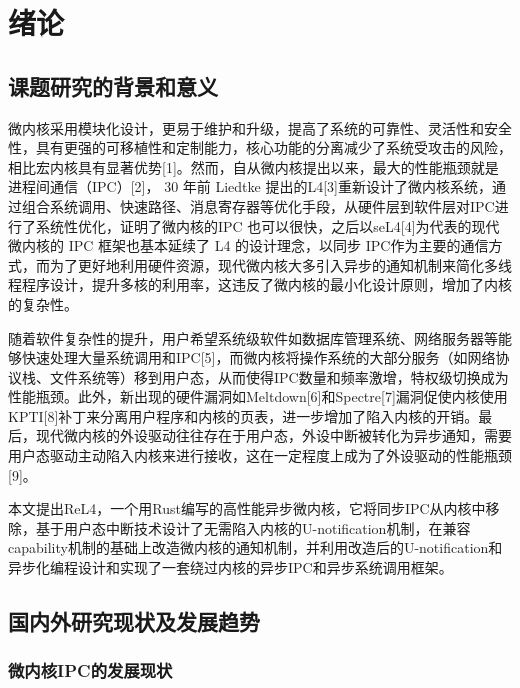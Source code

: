 \chapter{绪论}
\label{chap:intro}
\section{课题研究的背景和意义}

微内核采用模块化设计，更易于维护和升级，提高了系统的可靠性、灵活性和安全性，具有更强的可移植性和定制能力，核心功能的分离减少了系统受攻击的风险，相比宏内核具有显著优势[1]。然而，自从微内核提出以来，最大的性能瓶颈就是进程间通信（IPC）[2]， 30 年前 Liedtke 提出的L4[3]重新设计了微内核系统，通过组合系统调用、快速路径、消息寄存器等优化手段，从硬件层到软件层对IPC进行了系统性优化，证明了微内核的IPC 也可以很快，之后以seL4[4]为代表的现代微内核的 IPC 框架也基本延续了 L4 的设计理念，以同步 IPC作为主要的通信方式，而为了更好地利用硬件资源，现代微内核大多引入异步的通知机制来简化多线程程序设计，提升多核的利用率，这违反了微内核的最小化设计原则，增加了内核的复杂性。

随着软件复杂性的提升，用户希望系统级软件如数据库管理系统、网络服务器等能够快速处理大量系统调用和IPC[5]，而微内核将操作系统的大部分服务（如网络协议栈、文件系统等）移到用户态，从而使得IPC数量和频率激增，特权级切换成为性能瓶颈。此外，新出现的硬件漏洞如Meltdown[6]和Spectre[7]漏洞促使内核使用 KPTI[8]补丁来分离用户程序和内核的页表，进一步增加了陷入内核的开销。最后，现代微内核的外设驱动往往存在于用户态，外设中断被转化为异步通知，需要用户态驱动主动陷入内核来进行接收，这在一定程度上成为了外设驱动的性能瓶颈[9]。

本文提出ReL4，一个用Rust编写的高性能异步微内核，它将同步IPC从内核中移除，基于用户态中断技术设计了无需陷入内核的U-notification机制，在兼容capability机制的基础上改造微内核的通知机制，并利用改造后的U-notification和异步化编程设计和实现了一套绕过内核的异步IPC和异步系统调用框架。


\section{国内外研究现状及发展趋势}

\subsection{微内核IPC的发展现状}

